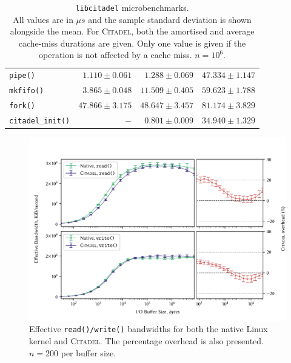 \begin{table}
\begin{tabular}{l@{\hskip 0.15in} r@{\hskip 0.6in} r@{\hskip 0.35in} r}
        \midrule 
        \texttt{pipe()} & $1.110\pm0.061$ & $1.288\pm0.069$ & $47.334\pm1.147$ \\
        \texttt{mkfifo()} & $3.865\pm0.048$ & $11.509\pm0.405$ & $59.623\pm1.788$ \\

        \midrule 
        \texttt{fork()} & $47.866\pm3.175$ & $48.647\pm3.457$ & $81.174\pm3.829$ \\
        \texttt{citadel\_init()} & $-$ & $0.801\pm0.009$ & $34.940\pm1.329$ \\
        \bottomrule
    \end{tabular}
    \vspace{5mm}
    \captionsetup{justification=centering}
    \caption[\texttt{libcitadel} microbenchmarks]{\texttt{libcitadel} microbenchmarks. \\ All values are in $\mu s$ and the sample standard deviation is shown alongside the mean. For \textsc{Citadel}, both the amortised and average cache-miss durations are given. Only one value is given if the operation is not affected by a cache miss. $n=10^6$.}
    \label{table:syscall-microbenchmarks}
\end{table}

\begin{figure}[h]
    \centering
    \includegraphics[width=\linewidth]{figures/graphs/io.pdf}
    \vspace{-5mm}
    \captionsetup{justification=centering}
    \caption[Effective \texttt{read()/write()} bandwidths for both the native Linux kernel and \textsc{Citadel}.]{Effective \texttt{read()/write()} bandwidths for both the native Linux kernel and \textsc{Citadel}. The percentage overhead is also presented. $n=200$ per buffer size.}
    \label{fig:io-graph}
\end{figure}


